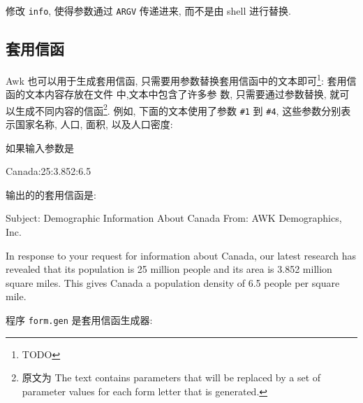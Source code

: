 \begin{exercise}
    修改 \texttt{info}, 使得参数通过 \texttt{ARGV} 传递进来, 而不是由 shell 
    进行替换.
\end{exercise}

\subsection{套用信函}
\label{subsec:form_letters}

Awk 也可以用于生成套用信函,
只需要用参数替换套用信函中的文本即可\footnote{TODO}:
套用信函的文本内容存放在文件  中,文本中包含了许多参
数, 只需要通过参数替换, 就可以生成不同内容的信函\footnote{原文为 The text
    contains parameters that will be replaced by a set of parameter values
for each form letter that is generated.}. 例如, 下面的文本使用了参数 
\verb'#1' 到 \verb'#4', 这些参数分别表示国家名称, 人口, 面积, 以及人口密度:

如果输入参数是
\begin{shell}
	Canada:25:3.852:6.5
\end{shell}
输出的的套用信函是:
\begin{shell}
	Subject: Demographic Information About Canada
	From: AWK Demographics, Inc.

	In response to your request for information about Canada,
	our latest research has revealed that its population is 25
	million people and its area is 3.852 million square miles.
	This gives Canada a population density of 6.5 people per
	square mile.
\end{shell}

程序 \verb'form.gen' 是套用信函生成器:

